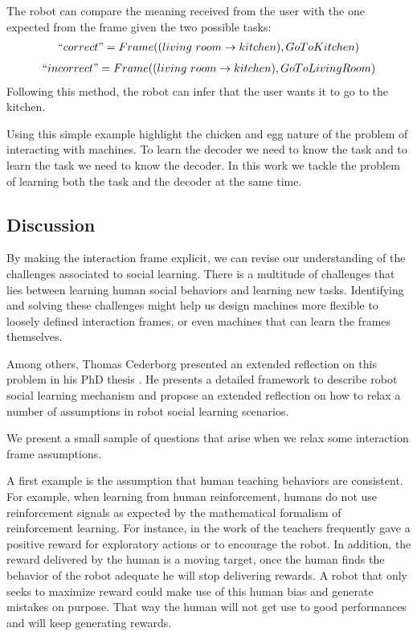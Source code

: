 The robot can compare the meaning received from the user with the one expected from the frame given the two possible tasks:
%
\begin{eqnarray}
``correct" = Frame((living~room \rightarrow kitchen), Go To Kitchen) \nonumber
\end{eqnarray}
\begin{eqnarray}
``incorrect" = Frame((living~room \rightarrow kitchen), Go To Living Room) \nonumber
\end{eqnarray}
%
Following this method, the robot can infer that the user wants it to go to the kitchen.

\transition

Using this simple example highlight the chicken and egg nature of the problem of interacting with machines. To learn the decoder we need to know the task and to learn the task we need to know the decoder. In this work we tackle the problem of learning both the task and the decoder at the same time.

\subsection{Discussion}

By making the interaction frame explicit, we can revise our understanding of the challenges associated to social learning. There is a multitude of challenges that lies between learning human social behaviors and learning new tasks. Identifying and solving these challenges might help us design machines more flexible to loosely defined interaction frames, or even machines that can learn the frames themselves.

Among others, Thomas Cederborg presented an extended reflection on this problem in his PhD thesis \cite{cederborg2014thesis}. He presents a detailed framework to describe robot social learning mechanism \cite{cederborg2014social} and propose an extended reflection on how to relax a number of assumptions in robot social learning scenarios. 

We present a small sample of questions that arise when we relax some interaction frame assumptions.

A first example is the assumption that human teaching behaviors are consistent. For example, when learning from human reinforcement, humans do not use reinforcement signals as expected by the mathematical formalism of reinforcement learning. For instance, in the work of \cite{thomaz2008teachable} the teachers frequently gave a positive reward for exploratory actions or to encourage the robot. In addition, the reward delivered by the human is a moving target, once the human finds the behavior of the robot adequate he will stop delivering rewards. A robot that only seeks to maximize reward could make use of this human bias and generate mistakes on purpose. That way the human will not get use to good performances and will keep generating rewards.


